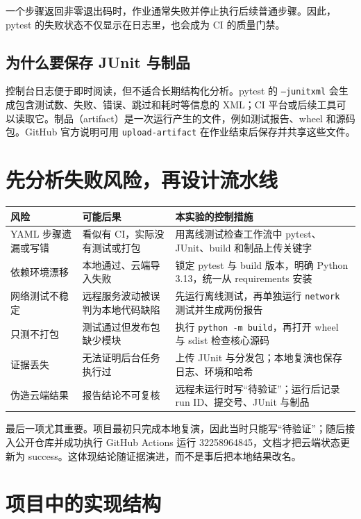 \documentclass[UTF8,zihao=-4,a4paper]{ctexart}
\newcommand{\code}[1]{\texttt{#1}}
\begin{document}
一个步骤返回非零退出码时，作业通常失败并停止执行后续普通步骤。因此，pytest 的失败状态不仅显示在日志里，也会成为 CI 的质量门禁。

\subsection{为什么要保存 JUnit 与制品}

控制台日志便于即时阅读，但不适合长期结构化分析。pytest 的 \code{--junitxml} 会生成包含测试数、失败、错误、跳过和耗时等信息的 XML；CI 平台或后续工具可以读取它。制品（artifact）是一次运行产生的文件，例如测试报告、wheel 和源码包。GitHub 官方说明可用 \code{upload-artifact} 在作业结束后保存并共享这些文件\cite{github-artifact}。

\section{先分析失败风险，再设计流水线}

\begin{longtable}{p{}p{}p{}}
\toprule
风险 & 可能后果 & 本实验的控制措施 \\
\midrule
\endhead
YAML 步骤遗漏或写错 & 看似有 CI，实际没有测试或打包 & 用离线测试检查工作流中 pytest、JUnit、build 和制品上传关键字 \\
依赖环境漂移 & 本地通过、云端导入失败 & 锁定 pytest 与 build 版本，明确 Python 3.13，统一从 requirements 安装 \\
网络测试不稳定 & 远程服务波动被误判为本地代码缺陷 & 先运行离线测试，再单独运行 \code{network} 测试并生成两份报告 \\
只测不打包 & 测试通过但发布包缺少模块 & 执行 \code{python -m build}，再打开 wheel 与 sdist 检查核心源码 \\
证据丢失 & 无法证明后台任务执行过 & 上传 JUnit 与分发包；本地复演也保存日志、环境和哈希 \\
伪造云端结果 & 报告结论不可复核 & 远程未运行时写“待验证”；运行后记录 run ID、提交号、JUnit 与制品 \\
\bottomrule
\end{longtable}

最后一项尤其重要。项目最初只完成本地复演，因此当时只能写“待验证”；随后接入公开仓库并成功执行 GitHub Actions 运行 32258964845，文档才把云端状态更新为 success。这体现结论随证据演进，而不是事后把本地结果改名。

\section{项目中的实现结构}
\end{document}
